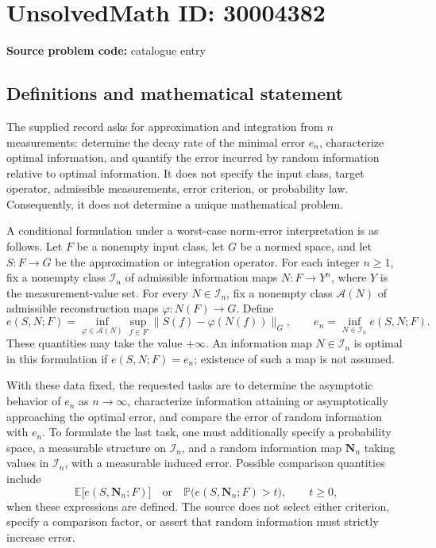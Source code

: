 \documentclass[11pt]{article}
\begin{document}
\section*{UnsolvedMath ID: 30004382}
\textbf{Source problem code:} catalogue entry
\subsection{Definitions and mathematical statement}
The supplied record asks for approximation and integration from \(n\) measurements: determine the decay rate of the minimal error \(e_n\), characterize optimal information, and quantify the error incurred by random information relative to optimal information. It does not specify the input class, target operator, admissible measurements, error criterion, or probability law. Consequently, it does not determine a unique mathematical problem.

A conditional formulation under a worst-case norm-error interpretation is as follows. Let \(F\) be a nonempty input class, let \(G\) be a normed space, and let \(S:F\to G\) be the approximation or integration operator. For each integer \(n\geq 1\), fix a nonempty class \(\mathcal I_n\) of admissible information maps \(N:F\to Y^n\), where \(Y\) is the measurement-value set. For every \(N\in\mathcal I_n\), fix a nonempty class \(\mathcal A(N)\) of admissible reconstruction maps \(\varphi:N(F)\to G\). Define
\[
 e(S,N;F)=\inf_{\varphi\in\mathcal A(N)}\sup_{f\in F}\|S(f)-\varphi(N(f))\|_G,
 \qquad
 e_n=\inf_{N\in\mathcal I_n}e(S,N;F).
\]
These quantities may take the value \(+\infty\). An information map \(N\in\mathcal I_n\) is optimal in this formulation if \(e(S,N;F)=e_n\); existence of such a map is not assumed.

With these data fixed, the requested tasks are to determine the asymptotic behavior of \(e_n\) as \(n\to\infty\), characterize information attaining or asymptotically approaching the optimal error, and compare the error of random information with \(e_n\). To formulate the last task, one must additionally specify a probability space, a measurable structure on \(\mathcal I_n\), and a random information map \(\mathbf N_n\) taking values in \(\mathcal I_n\), with a measurable induced error. Possible comparison quantities include
\[
 \mathbb E\bigl[e(S,\mathbf N_n;F)\bigr]
 \quad\text{or}\quad
 \mathbb P\bigl(e(S,\mathbf N_n;F)>t\bigr),\qquad t\geq 0,
\]
when these expressions are defined. The source does not select either criterion, specify a comparison factor, or assert that random information must strictly increase error.
\end{document}
